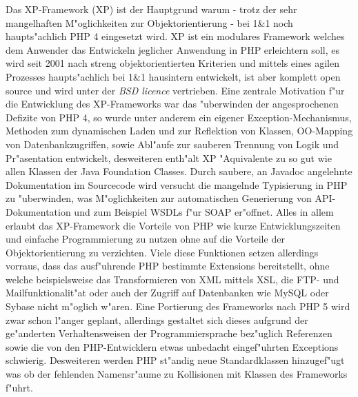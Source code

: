 Das XP-Framework \cite{XPHP} (XP) ist der Hauptgrund warum - trotz der sehr mangelhaften M"oglichkeiten zur 
Objektorientierung - bei 1\&1 noch haupts"achlich PHP 4 eingesetzt wird. XP ist ein modulares Framework welches
dem Anwender das Entwickeln jeglicher Anwendung in PHP erleichtern soll, es wird seit 2001 nach streng 
objektorientierten Kriterien und mittels eines agilen Prozesses haupts"achlich bei 1\&1 hausintern entwickelt,
ist aber komplett open source und wird unter der \emph{BSD licence} \cite{BSDLICENCE} vertrieben.
Eine zentrale Motivation f"ur die Entwicklung des XP-Frameworks war das "uberwinden der angesprochenen
Defizite von PHP 4, so wurde unter anderem ein eigener Exception-Mechanismus, Methoden zum dynamischen
Laden und zur Reflektion von Klassen, OO-Mapping von Datenbankzugriffen, sowie Abl"aufe zur sauberen 
Trennung von Logik und Pr"asentation entwickelt, desweiteren enth"alt XP "Aquivalente zu so gut wie allen Klassen 
der Java Foundation Classes.
Durch saubere, an Javadoc \cite{JAVADOC} angelehnte Dokumentation im Sourcecode wird versucht die mangelnde
Typisierung in PHP zu "uberwinden, was M"oglichkeiten zur automatischen Generierung von API-Dokumentation und zum
Beispiel WSDLs \cite{WSDLSPEC} f"ur SOAP er"offnet.
Alles in allem erlaubt das XP-Framework die Vorteile von PHP wie kurze Entwicklungszeiten und einfache 
Programmierung zu nutzen ohne auf die Vorteile der Objektorientierung zu verzichten.
Viele diese Funktionen setzen allerdings vorraus, dass das ausf"uhrende PHP bestimmte Extensions bereitstellt,
ohne welche beispielsweise das Transformieren von XML mittels XSL, die FTP- und Mailfunktionalit"at oder auch
der Zugriff auf Datenbanken wie MySQL oder Sybase nicht m"oglich w"aren.
Eine Portierung des Frameworks nach PHP 5 wird zwar schon l"anger geplant, allerdings gestaltet sich dieses 
aufgrund der ge"anderten Verhaltensweisen der Programmiersprache bez"uglich Referenzen sowie die von den PHP-Entwicklern
etwas unbedacht eingef"uhrten Exceptions schwierig. Desweiteren werden PHP st"andig neue Standardklassen
hinzugef"ugt was ob der fehlenden Namensr"aume zu Kollisionen mit Klassen des Frameworks f"uhrt.


